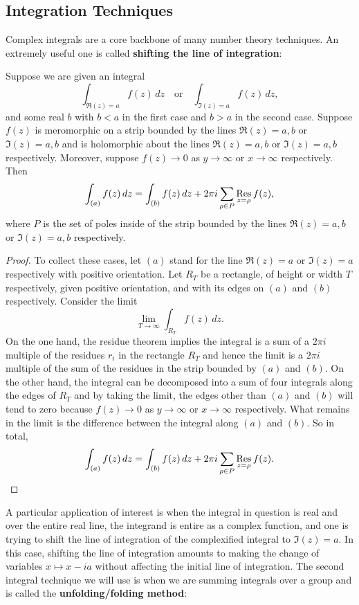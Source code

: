    \subsection*{Integration Techniques}
      Complex integrals are a core backbone of many number theory techniques. An extremely useful one is called \textbf{shifting the line of integration}:

      \begin{theorem*}
        Suppose we are given an integral
        \[
          \int_{\Re(z) = a}f(z)\,dz \quad \text{or} \quad \int_{\Im(z) = a}f(z)\,dz,
        \]
        and some real $b$ with $b < a$ in the first case and $b > a$ in the second case. Suppose $f(z)$ is meromorphic on a strip bounded by the lines $\Re(z) = a,b$ or $\Im(z) = a,b$ and is holomorphic about the lines $\Re(z) = a,b$ or $\Im(z) = a,b$ respectively. Moreover, suppose $f(z) \to 0$ as $y \to \infty$ or $x \to \infty$ respectively. Then
        \[
          \int_{(a)}f(z)\,dz = \int_{(b)}f(z)\,dz+2\pi i\sum_{\rho \in P}\operatorname*{\mathrm{Res}}_{z = \rho}f(z),
        \]
        where $P$ is the set of poles inside of the strip bounded by the lines $\Re(z) = a,b$ or $\Im(z) = a,b$ respectively.
      \end{theorem*}
      \begin{proof}
        To collect these cases, let $(a)$ stand for the line $\Re(z) = a$ or $\Im(z) = a$ respectively with positive orientation. Let $R_{T}$ be a rectangle, of height or width $T$ respectively, given positive orientation, and with its edges on $(a)$ and $(b)$ respectively. Consider the limit
        \[
          \lim_{T \to \infty}\int_{R_{T}}f(z)\,dz.
        \]
        On the one hand, the residue theorem implies the integral is a sum of a $2\pi i$ multiple of the residues $r_{i}$ in the rectangle $R_{T}$ and hence the limit is a $2\pi i$ multiple of the sum of the residues in the strip bounded by $(a)$ and $(b)$. On the other hand, the integral can be decomposed into a sum of four integrals along the edges of $R_{T}$ and by taking the limit, the edges other than $(a)$ and $(b)$ will tend to zero because $f(z) \to 0$ as $y \to \infty$ or $x \to \infty$ respectively. What remains in the limit is the difference between the integral along $(a)$ and $(b)$. So in total,
        \[
          \int_{(a)}f(z)\,dz = \int_{(b)}f(z)\,dz+2\pi i\sum_{\rho \in P}\operatorname*{\mathrm{Res}}_{z = \rho}f(z).
        \]
      \end{proof}

      A particular application of interest is when the integral in question is real and over the entire real line, the integrand is entire as a complex function, and one is trying to shift the line of integration of the complexified integral to $\Im(z) = a$. In this case, shifting the line of integration amounts to making the change of variables $x \mapsto x-ia$ without affecting the initial line of integration. The second integral technique we will use is when we are summing integrals over a group and is called the \textbf{unfolding/folding method}:

